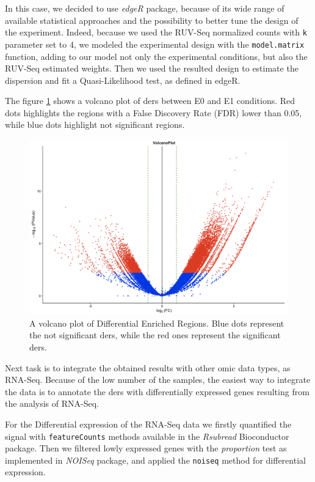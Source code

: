 In this case, we decided to use \textit{edgeR} package, because of its wide range of  available statistical approaches and the possibility to better tune the design of the experiment. 
Indeed, because we used the RUV-Seq normalized counts with \lstinline{k} parameter set to 4, we modeled the experimental design with the \lstinline{model.matrix} function, adding to our model not only the experimental conditions, but also the RUV-Seq estimated weights.
Then we used the resulted design to estimate the dispersion and fit a Quasi-Likelihood test, as defined in edgeR.

The figure \ref{fig:depeaksdescan} shows a volcano plot of \glspl{der} between E0 and E1 conditions.
Red dots highlights the regions with a False Discovery Rate (FDR) lower than 0.05, while blue dots highlight not significant regions.
 
\begin{figure}[h]
\centering
\includegraphics[width=\textwidth, height=\textheight, keepaspectratio]{img/descan2/DE_peaks.png}
\caption[Differential Enrichment Regions Volcano]{A volcano plot of Differential Enriched Regions. Blue dots represent the not significant \glspl{der}, while the red ones represent the significant \glspl{der}.}
\label{fig:depeaksdescan}
\centering
\end{figure}

Next task is to integrate the obtained results with other omic data types, as RNA-Seq. 
Because of the low number of the samples, the easiest way to integrate the data is to annotate the \glspl{der} with differentially expressed genes resulting from the analysis of RNA-Seq.

For the Differential expression of the RNA-Seq data we firstly quantified the signal with \lstinline{featureCounts} methods available in the \textit{Rsubread} \cite{Liao2013} Bioconductor package.
Then we filtered lowly expressed genes with the \textit{proportion} test  as implemented in \textit{NOISeq} package, and applied the \lstinline{noiseq} method for differential expression.%

